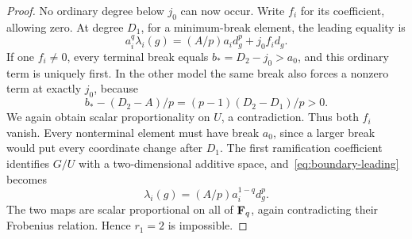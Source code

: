 \begin{proof}
No ordinary degree below $j_0$ can now occur. Write $f_i$ for its coefficient, allowing zero. At degree $D_1$, for a minimum-break element, the leading equality is
\begin{equation}\label{eq:boundary-leading}
 a_i^q\lambda_i(g)=(A/p)a_i d_g^p+j_0f_i d_g.
\end{equation}
If one $f_i\ne0$, every terminal break equals $b_*=D_2-j_0>a_0$, and this ordinary term is uniquely first. In the other model the same break also forces a nonzero term at exactly $j_0$, because
\[
 b_*-(D_2-A)/p=(p-1)(D_2-D_1)/p>0.
\]
We again obtain scalar proportionality on $U$, a contradiction. Thus both $f_i$ vanish. Every nonterminal element must have break $a_0$, since a larger break would put every coordinate change after $D_1$. The first ramification coefficient identifies $G/U$ with a two-dimensional additive space, and~\eqref{eq:boundary-leading} becomes
\[
                       \lambda_i(g)=(A/p)a_i^{1-q}d_g^p.
\]
The two maps are scalar proportional on all of $\mathbf F_q$, again contradicting their Frobenius relation. Hence $r_1=2$ is impossible.
\end{proof}

